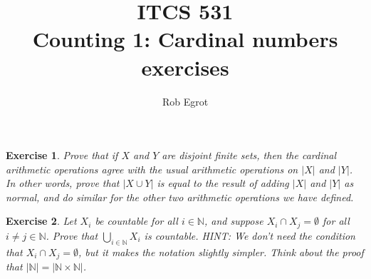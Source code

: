 \documentclass{article}
\title{ITCS 531 \\Counting 1: Cardinal numbers exercises}
\author{Rob Egrot}
\date{}
\theoremstyle{plain}
\newtheorem{Q}{Exercise}{\bfseries}{\upshape}
\newcommand{\bN}{\mathbb{N}}
\begin{document}
\maketitle

\begin{Q}
Prove that if $X$ and $Y$ are disjoint finite sets, then the cardinal arithmetic operations agree with the usual arithmetic operations on $|X|$ and $|Y|$. In other words, prove that $|X\cup Y|$ is equal to the result of adding $|X|$ and $|Y|$ as normal, and do similar for the other two arithmetic operations we have defined.
\end{Q}
\begin{comment}
\textbf{Solution:} \begin{enumerate}[]
\item $|X|+|Y|$: Since $X$ and $Y$ are disjoint, if $z\in X\cup Y$ then either $z\in X$, or $z\in Y$, but not both. So, if $|X| = m$ and $|Y|=n$, we have $|X\cup Y| = m+n = |X|+|Y|$ as required.
\item $|X|\times|Y|$: $X\times Y = \{(x,y):x\in X \text{ and } y\in Y\}$. If $|X| = m$ and $|Y|=n$ then $|X\times Y| = m\times n = |X|\times|Y|$.
\item $|X|^{|Y|}$: $X^Y$ is the set of all functions from $Y$ to $X$. How many functions are there? Well, such a function must map each element of $Y$ to exactly one element of $X$. So, for each $y\in Y$ there are exactly $|X|$ choices. So, if $|X| = m$ and $|Y|=n$, we get $m^n$ different functions. So $|X^Y|=m^n$ as required.
\end{enumerate}
\end{comment}

\begin{Q}
Let $X_i$ be countable for all $i\in \bN$, and suppose $X_i\cap X_j=\emptyset$ for all $i\neq j\in \bN$. Prove that $\bigcup_{i\in\bN} X_i$ is countable. HINT: We don't need the condition that $X_i\cap X_j=\emptyset$, but it makes the notation slightly simpler. Think about the proof that $|\bN|=|\bN\times\bN|$. 
\end{Q}
\begin{comment}
\textbf{Solution:} 
We need to find an injective function from $\bigcup_{i\in\bN} X_i$ to $\bN$. Since $\bN\times\bN$ is countable, there is an injective $f:\bN\times\bN\to \bN$. Since each $X_i$ is countable, there are injective functions $g_i:X_i\to \bN$ for all $i\in\bN$. Define a function $g:\bigcup_{i\in\bN} X_i\to \bN\times\bN$ by $g(x) = (i,g_i(x))$, where $x\in X_i$. This is well defined because $X_i\cap X_j = \emptyset$ for all $i\neq j$. Then $g$ is injective, because, given $x_1\in X_i$ and $x_2\in X_j$ with $x_1\neq x_2$, if $i\neq j$ then $(i,g_i(x_1))\neq (j,g_j(x_2))$, as $i\neq j$, and if $i=j$ then $g_i(x_1)\neq g_i(x_2)$, as $g_i$ is injective. So $f\circ g:\bigcup_{i\in\bN} X_i\to \bN$ is the composition of two injective functions, and so is injective. This gives us the injective function we need.   
\end{comment}
\end{document}
